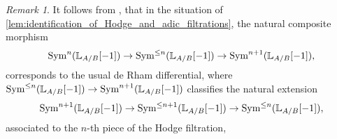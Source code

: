 \documentclass[10pt,a4paper,reqno]{amsart} %
\theoremstyle{plain}
\theoremstyle{definition}
\theoremstyle{remark}
\newtheorem{rem}[thm]{Remark}
\numberwithin{equation}{section}
\begin{document}

\begin{rem} It follows from \cite[\S 9, Theorem 5.5.4]{Gaitsgory_Study_II}, that in the situation of \cref{lem:identification_of_Hodge_and_adic_filtrations}, the natural composite morphism
        \[
            \operatorname{Sym}^n(\mathbb L_{A/ B} [-1]) \to \operatorname{Sym}^{ \le n}(\mathbb L_{A/ B}[-1]) \to \operatorname{Sym}^{n+1}(\mathbb L_{A/ B}[-1]), 
        \]
    corresponds to the usual de Rham differential,
    where $\operatorname{Sym}^{ \le n}(\mathbb L_{A/ B}[-1]) \to \operatorname{Sym}^{n+1}(\mathbb L_{A/ B}[-1])$ classifies the natural extension
        \[
            \operatorname{Sym}^{n+1}(\mathbb L_{A/ B} [-1]) \to \operatorname{Sym}^{ \le n +1 }(\mathbb L_{A/ B}[-1]) \to \operatorname{Sym}^{\le n}(\mathbb L_{A/ B}[-1]),
        \]
    associated to the $n$-th piece of the Hodge filtration,
\end{rem}
\end{document}
